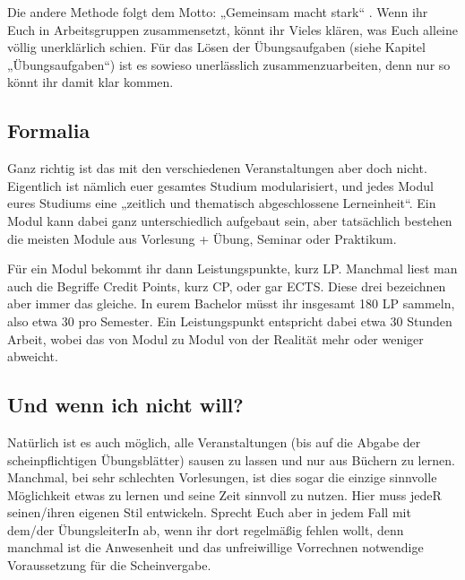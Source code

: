 Die andere Methode folgt dem Motto: „Gemeinsam macht stark“ . Wenn ihr Euch in
Arbeitsgruppen zusammensetzt, könnt ihr Vieles klären, was Euch alleine völlig
unerklärlich schien. Für das Lösen der Übungsaufgaben (siehe Kapitel
„Übungsaufgaben“) ist es sowieso unerlässlich zusammenzuarbeiten, denn nur so
könnt ihr damit klar kommen.

\subsection{Formalia}
Ganz richtig ist das mit den verschiedenen Veranstaltungen aber doch nicht.
Eigentlich ist nämlich euer gesamtes Studium modularisiert, und jedes Modul
eures Studiums eine „zeitlich und thematisch abgeschlossene Lerneinheit“.
Ein Modul kann dabei ganz unterschiedlich aufgebaut sein, aber tatsächlich
bestehen die meisten Module aus Vorlesung + Übung, Seminar oder Praktikum.

Für ein Modul bekommt ihr dann Leistungspunkte, kurz LP.
Manchmal liest man auch die Begriffe Credit Points, kurz CP, oder gar ECTS.
Diese drei bezeichnen aber immer das gleiche.
In eurem Bachelor müsst ihr insgesamt 180 LP sammeln, also etwa 30 pro Semester.
Ein Leistungspunkt entspricht dabei etwa 30 Stunden Arbeit, wobei das von Modul
zu Modul von der Realität mehr oder weniger abweicht.

\subsection{Und wenn ich nicht will?}
Natürlich ist es auch möglich, alle Veranstaltungen (bis auf die Abgabe der scheinpflichtigen Übungsblätter) sausen zu lassen und nur aus Büchern zu lernen. Manchmal, bei sehr schlechten Vorlesungen, ist dies sogar die einzige sinnvolle Möglichkeit etwas zu lernen und seine Zeit sinnvoll zu nutzen. Hier muss jedeR seinen/ihren eigenen Stil entwickeln. Sprecht Euch aber in jedem Fall mit dem/der ÜbungsleiterIn ab, wenn ihr dort regelmäßig fehlen wollt, denn manchmal ist die Anwesenheit und das unfreiwillige Vorrechnen notwendige Voraussetzung für die Scheinvergabe.
